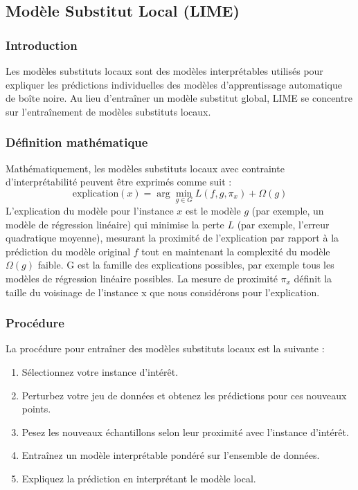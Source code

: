 \subsection{Modèle Substitut Local (LIME)}

\subsubsection{Introduction}

Les modèles substituts locaux sont des modèles interprétables utilisés pour expliquer les prédictions individuelles des modèles d'apprentissage automatique de boîte noire. Au lieu d'entraîner un modèle substitut global, LIME se concentre sur l'entraînement de modèles substituts locaux.

\subsubsection{Définition mathématique}

Mathématiquement, les modèles substituts locaux avec contrainte d'interprétabilité peuvent être exprimés comme suit :
\[ \text{explication}(x) = \arg\min_{g\in{}G}L(f,g,\pi_x)+\Omega(g) \]
L'explication du modèle pour l'instance \( x \) est le modèle \( g \) (par exemple, un modèle de régression linéaire) qui minimise la perte \( L \) (par exemple, l'erreur quadratique moyenne), mesurant la proximité de l'explication par rapport à la prédiction du modèle original \( f \) tout en maintenant la complexité du modèle \( \Omega(g) \) faible.
G est la famille des explications possibles, par exemple tous les modèles de régression linéaire possibles.
La mesure de proximité $\pi_x$ définit la taille du voisinage de l'instance x que nous considérons pour l'explication.
\subsubsection{Procédure}

La procédure pour entraîner des modèles substituts locaux est la suivante :
\begin{enumerate}
    \item Sélectionnez votre instance d'intérêt.
    \item Perturbez votre jeu de données et obtenez les prédictions pour ces nouveaux points.
    \item Pesez les nouveaux échantillons selon leur proximité avec l'instance d'intérêt.
    \item Entraînez un modèle interprétable pondéré sur l'ensemble de données.
    \item Expliquez la prédiction en interprétant le modèle local.
\end{enumerate}

